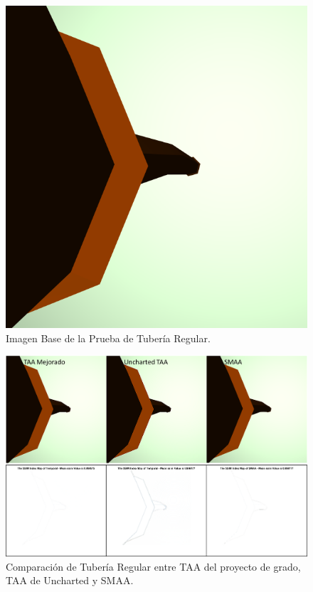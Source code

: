 \documentclass[pregrado]{tesis-usb} %
\begin{document}
\begin{figure}[!htb]
	\centering
	\includegraphics[scale=0.2]{images/results/pipe_regular_sobel_ground_truth.png}
	\caption{Imagen Base de la Prueba de Tubería Regular.}\label{fig:pipe_regular_truth}
\end{figure}


\begin{figure}[!htb]
	\centering
	\includegraphics[scale=0.5]{images/results/pipe_regular.png}
	\caption{Comparación de Tubería Regular entre TAA del proyecto de grado, TAA de Uncharted y SMAA.}\label{fig:pipe_regular_render}
\end{figure}
\end{document}
